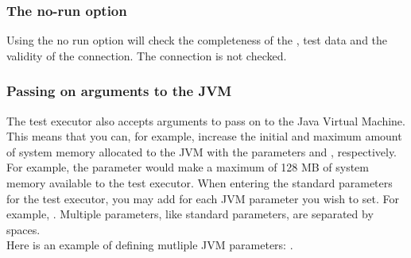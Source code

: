 \subsubsection{The no-run option}
Using the no run option will check the completeness of the \gdproject{}, test data and the validity of the \gddb{} connection. The \gdagent{} connection is not checked. 

\subsubsection{Passing on arguments to the JVM}
The test executor also accepts arguments to pass on to the Java Virtual Machine. This means that you can, for example, increase the initial and maximum amount of system memory allocated to the JVM with the parameters  and , respectively. For example, the parameter  would make a maximum of 128 MB of system memory available to the test executor. When entering the standard parameters for the test executor, you may add  for each JVM parameter you wish to set. For example, . Multiple parameters, like standard parameters, are separated by spaces. \\
Here is an example of defining mutliple JVM parameters: .
